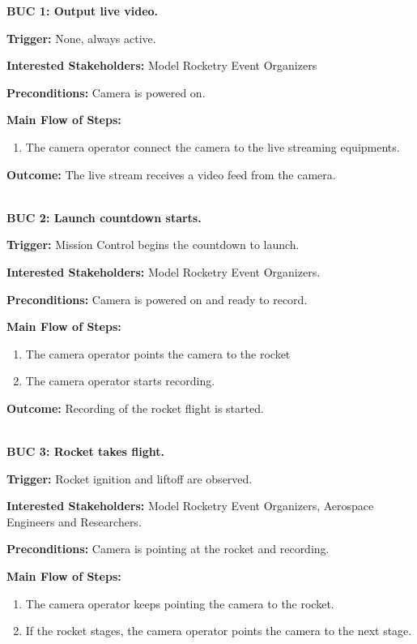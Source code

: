 \documentclass[12pt]{article}
\begin{document}
\textbf{BUC 1: Output live video.}

\textbf{Trigger:} None, always active.

\textbf{Interested Stakeholders:} Model Rocketry Event Organizers

\textbf{Preconditions:} Camera is powered on.

\textbf{Main Flow of Steps:}
\begin{enumerate}
  \item The camera operator connect the camera to the live streaming equipments.
\end{enumerate}

\textbf{Outcome:} The live stream receives a video feed from the camera.

~\\

\textbf{BUC 2: Launch countdown starts.}

\textbf{Trigger:} Mission Control begins the countdown to launch.

\textbf{Interested Stakeholders:} Model Rocketry Event Organizers.

\textbf{Preconditions:} Camera is powered on and ready to record.

\textbf{Main Flow of Steps:}
\begin{enumerate}
  \item The camera operator points the camera to the rocket
  \item The camera operator starts recording.
\end{enumerate}

\textbf{Outcome:} Recording of the rocket flight is started.

~\\

\textbf{BUC 3: Rocket takes flight.}

\textbf{Trigger:} Rocket ignition and liftoff are observed.

\textbf{Interested Stakeholders:} Model Rocketry Event Organizers, Aerospace Engineers and Researchers.

\textbf{Preconditions:} Camera is pointing at the rocket and recording.

\textbf{Main Flow of Steps:}
\begin{enumerate}
  \item The camera operator keeps pointing the camera to the rocket.
  \item If the rocket stages, the camera operator points the camera to the next stage.
\end{enumerate}
\end{document}
